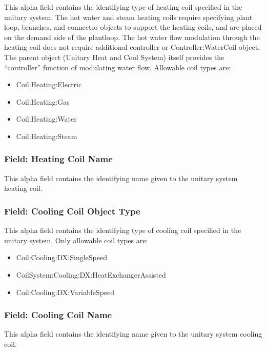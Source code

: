 This alpha field contains the identifying type of heating coil specified in the unitary system. The hot water and steam heating coils require specifying plant loop, branches, and connector objects to support the heating coils, and are placed on the demand side of the plantloop. The hot water flow modulation through the heating coil does not require additional controller or Controller:WaterCoil object. The parent object (Unitary Heat and Cool System) itself provides the ``controller'' function of modulating water flow. Allowable coil types are:

\begin{itemize}
\item
  Coil:Heating:Electric
\item
  Coil:Heating:Gas
\item
  Coil:Heating:Water
\item
  Coil:Heating:Steam
\end{itemize}

\subsubsection{Field: Heating Coil Name}\label{field-heating-coil-name-2}

This alpha field contains the identifying name given to the unitary system heating coil.

\subsubsection{Field: Cooling Coil Object Type}\label{field-cooling-coil-object-type-2-000}

This alpha field contains the identifying type of cooling coil specified in the unitary system. Only allowable coil types are:

\begin{itemize}
\item
  Coil:Cooling:DX:SingleSpeed
\item
  CoilSystem:Cooling:DX:HeatExchangerAssisted
\item
  Coil:Cooling:DX:VariableSpeed
\end{itemize}

\subsubsection{Field: Cooling Coil Name}\label{field-cooling-coil-name-2-000}

This alpha field contains the identifying name given to the unitary system cooling coil.


